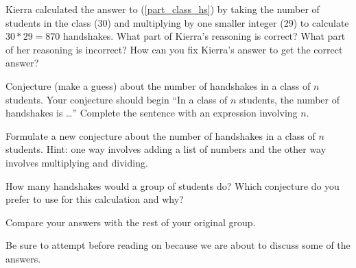 \begin{act} 
\begin{actpart}
        \item Kierra calculated the answer to (\ref{part_class_hs}) by taking the number of students in the class (30) and multiplying by one smaller integer (29) to calculate $30*29=870$ handshakes.  What part of Kierra's reasoning is correct?  What part of her reasoning is incorrect?  How can you fix Kierra's answer to get the correct answer?
        
        \item Conjecture (make a guess) about the number of handshakes in a class of $n$ students.  Your conjecture should begin ``In a class of $n$ students, the number of handshakes is \ldots''  Complete the sentence with an expression involving $n$.        
        \item Formulate a new conjecture about the number of handshakes in a class of $n$ students.  Hint: one way involves adding a list of numbers and the other way involves multiplying and dividing.
        \item How many handshakes would a group of  students do?  Which conjecture do you prefer to use for this calculation and why?
        \item Compare your answers with the rest of your original group.
    \end{actpart}   
\end{act}

Be sure to attempt  before reading on because we are about to discuss some of the answers.

